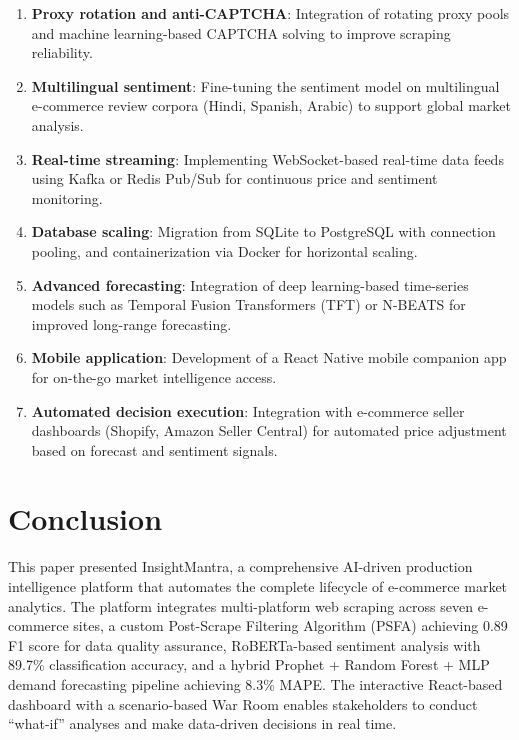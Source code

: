 \documentclass[conference]{IEEEtran}
\begin{document}
\begin{enumerate}
    \item \textbf{Proxy rotation and anti-CAPTCHA}: Integration of rotating proxy pools and machine learning-based CAPTCHA solving to improve scraping reliability.
    \item \textbf{Multilingual sentiment}: Fine-tuning the sentiment model on multilingual e-commerce review corpora (Hindi, Spanish, Arabic) to support global market analysis.
    \item \textbf{Real-time streaming}: Implementing WebSocket-based real-time data feeds using Kafka or Redis Pub/Sub for continuous price and sentiment monitoring.
    \item \textbf{Database scaling}: Migration from SQLite to PostgreSQL with connection pooling, and containerization via Docker for horizontal scaling.
    \item \textbf{Advanced forecasting}: Integration of deep learning-based time-series models such as Temporal Fusion Transformers (TFT) or N-BEATS for improved long-range forecasting.
    \item \textbf{Mobile application}: Development of a React Native mobile companion app for on-the-go market intelligence access.
    \item \textbf{Automated decision execution}: Integration with e-commerce seller dashboards (Shopify, Amazon Seller Central) for automated price adjustment based on forecast and sentiment signals.
\end{enumerate}

\section{Conclusion}

This paper presented InsightMantra, a comprehensive AI-driven production intelligence platform that automates the complete lifecycle of e-commerce market analytics. The platform integrates multi-platform web scraping across seven e-commerce sites, a custom Post-Scrape Filtering Algorithm (PSFA) achieving 0.89 F1 score for data quality assurance, RoBERTa-based sentiment analysis with 89.7\% classification accuracy, and a hybrid Prophet + Random Forest + MLP demand forecasting pipeline achieving 8.3\% MAPE. The interactive React-based dashboard with a scenario-based War Room enables stakeholders to conduct ``what-if'' analyses and make data-driven decisions in real time.
\end{document}
